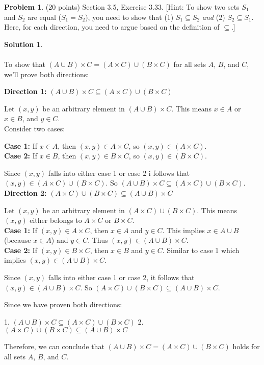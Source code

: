 \documentclass{article}
\theoremstyle{definition}
\newtheorem{problem}{Problem}
\newtheorem*{solution}{Solution}
\begin{document}
\newpage
\begin{problem} (20 points) Section 3.5, Exercise 3.33.
[Hint: To show two sets $S_1$ and $S_2$ are equal ($S_1 = S_2$), you need to 
show that (1) $S_1\subseteq S_2$ \textit{and} (2) $S_2\subseteq S_1$. Here, for each
direction, you need to argue based on the definition of $\subseteq$.] 
\end{problem}
\begin{solution} 
 
 ~\\ 
 ~\\ 
To show that $(A \cup B) \times C = (A \times C) \cup (B \times C)$ for all sets $A$, $B$, and $C$, we'll prove both directions:

\textbf{Direction 1:} $(A \cup B) \times C \subseteq (A \times C) \cup (B \times C)$

Let $(x, y)$ be an arbitrary element in $(A \cup B) \times C$. This means $x \in A$ or $x \in B$, and $y \in C$.
~\\
Consider two cases:

\textbf{Case 1:} If $x \in A$, then $(x, y) \in A \times C$, so $(x, y) \in (A \times C)$.
~\\
\textbf{Case 2:} If $x \in B$, then $(x, y) \in B \times C$, so $(x, y) \in (B \times C)$.

Since $(x, y)$ falls into either case 1 or case 2 i follows that $(x, y) \in (A \times C) \cup (B \times C)$. So $(A \cup B) \times C \subseteq (A \times C) \cup (B \times C)$.
~\\
\textbf{Direction 2:} $(A \times C) \cup (B \times C) \subseteq (A \cup B) \times C$

Let $(x, y)$ be an arbitrary element in $(A \times C) \cup (B \times C)$. This means $(x, y)$ either belongs to $A \times C$ or $B \times C$.
~\\
\textbf{Case 1:} If $(x, y) \in A \times C$, then $x \in A$ and $y \in C$. This implies $x \in A \cup B$ (because $x \in A$) and $y \in C$. Thus $(x, y) \in (A \cup B) \times C$.
~\\
\textbf{Case 2:} If $(x, y) \in B \times C$, then $x \in B$ and $y \in C$. Similar to case 1 which implies $(x, y) \in (A \cup B) \times C$.

Since $(x, y)$ falls into either case 1 or case 2, it follows that $(x, y) \in (A \cup B) \times C$. So $(A \times C) \cup (B \times C) \subseteq (A \cup B) \times C$.

Since we have proven both directions:

1. $(A \cup B) \times C \subseteq (A \times C) \cup (B \times C)$
2. $(A \times C) \cup (B \times C) \subseteq (A \cup B) \times C$

Therefore, we can conclude that $(A \cup B) \times C = (A \times C) \cup (B \times C)$ holds for all sets $A$, $B$, and $C$.
\end{solution}
\end{document}
